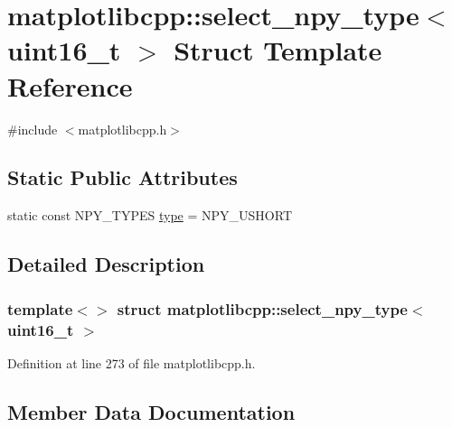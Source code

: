 \hypertarget{structmatplotlibcpp_1_1select__npy__type_3_01uint16__t_01_4}{}\section{matplotlibcpp\+::select\+\_\+npy\+\_\+type$<$ uint16\+\_\+t $>$ Struct Template Reference}
\label{structmatplotlibcpp_1_1select__npy__type_3_01uint16__t_01_4}


{\ttfamily \#include $<$matplotlibcpp.\+h$>$}

\subsection*{Static Public Attributes}
\begin{DoxyCompactItemize}
\item 
static const N\+P\+Y\+\_\+\+T\+Y\+P\+ES \mbox{\hyperlink{structmatplotlibcpp_1_1select__npy__type_3_01uint16__t_01_4_aca209b33cc0bcaad16c01bff097a075f}{type}} = N\+P\+Y\+\_\+\+U\+S\+H\+O\+RT
\end{DoxyCompactItemize}


\subsection{Detailed Description}
\subsubsection*{template$<$$>$\newline
struct matplotlibcpp\+::select\+\_\+npy\+\_\+type$<$ uint16\+\_\+t $>$}



Definition at line 273 of file matplotlibcpp.\+h.



\subsection{Member Data Documentation}
\mbox{\label{structmatplotlibcpp_1_1select__npy__type_3_01uint16__t_01_4_aca209b33cc0bcaad16c01bff097a075f}} 
